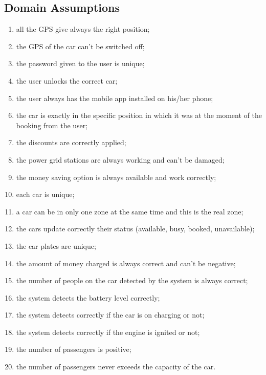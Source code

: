 \subsection{Domain Assumptions}
\begin{enumerate}
	\item all the GPS give always the right position;
	\item the GPS of the car can't be switched off;
	\item the password given to the user is unique;
	\item the user unlocks the correct car;
	\item the user always has the mobile app installed on his/her phone;
	\item the car is exactly in the specific position in which it was at the moment of the booking from the user;
	\item the discounts are correctly applied;
	\item the power grid stations are always working and can't be damaged;
	\item the money saving option is always available and work correctly;
	\item each car is unique;
	\item a car can be in only one zone at the same time and this is the real zone;
	\item the cars update correctly their status (available, busy, booked, unavailable);
	\item the car plates are unique;
    \item the amount of money charged is always correct and can't be negative;
    \item the number of people on the car detected by the system is always correct;
    \item the system detects the battery level correctly;
    \item the system detects correctly if the car is on charging or not;
    \item the system detects correctly if the engine is ignited or not;
    \item the number of passengers is positive;
    \item the number of passengers never exceeds the capacity of the car.
\end{enumerate}
